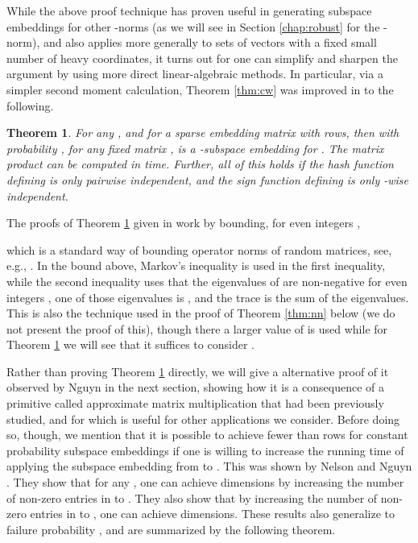 \documentclass[11pt]{article}
\newtheorem{theorem}{Theorem}
\begin{document}
While the above proof technique has proven useful in generating  subspace embeddings for other -norms
(as we will see in Section \ref{chap:robust} for the -norm), 
and also applies more generally to sets of  vectors with a fixed small number of heavy coordinates, 
it turns out for  one can simplify and sharpen the argument by using 
more direct linear-algebraic methods.
In particular, via a simpler second moment calculation, Theorem \ref{thm:cw} 
was improved in \cite{MM13,JH13} to the following.
\begin{theorem}\label{thm:mmnn}\cite{MM13,JH13}
For any , and for  a sparse embedding matrix with  rows, 
then with probability , for any fixed 
matrix ,  is a  -subspace embedding for . 
The matrix product 
 can be computed in  time. Further, all of this holds if the hash function
 defining  is only pairwise independent, and the sign function  defining  is only
-wise independent. 
\end{theorem}
The proofs of Theorem \ref{thm:mmnn} given in \cite{MM13,JH13} work by bounding, for even integers ,

which is a standard way of bounding operator norms of random matrices, see, e.g., \cite{by93}. 
In the bound above, Markov's inequality is used in the first inequality, while the second inequality
uses that the eigenvalues of  are non-negative for even integers
, one of those eigenvalues is , and the trace is the sum
of the eigenvalues. 
This is also the technique
used in the proof of Theorem \ref{thm:nn} below (we do not present the proof of this), 
though there a larger value of  is used while
for Theorem \ref{thm:mmnn} we will see that it suffices to consider . 

Rather than proving Theorem \ref{thm:mmnn} directly, we will give a 
alternative proof of it observed by Nguyn \cite{n13}
in the next section, showing how it is a consequence of a primitive called approximate matrix multiplication that
had been previously studied, and for which is useful for other applications we consider. 
Before doing so, though, we mention that it is possible to achieve fewer than  rows for constant
probability subspace embeddings 
if one is willing to increase the running time of applying the subspace embedding from 
 to . 
This was shown by Nelson
and Nguyn \cite{JH13}. 
They show that for any , one can achieve  dimensions
by increasing the number of non-zero entries in  to . They also show that 
by increasing the number of non-zero entries in  to , 
one can achieve  dimensions. These results also generalize to failure probability ,
and are summarized by the following theorem. 
\end{document}
